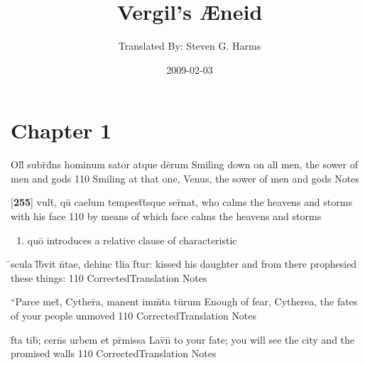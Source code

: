 \documentclass[]{book}
\title{Vergil's {\AE}neid}
\author{ Translated By:  Steven G. Harms }
\date{2009-02-03}
\begin{document}

\ifpdf
{}
\else
{}
\fi

\enumstyle 

\maketitle
\tableofcontents

\chapter{Chapter 1}
%
%
%
%
%
%
%
%
%

\latline
  {Oll\={\macron {\i}} subr\={\macron {\i}}d\={}ns hominum sator atque de\={}rum}
  { Smiling down on all men, the sower of men and gods }
  {110}
  { Smiling at that one, Venus, the sower of men and gods }
  { Notes }


\latline
  {[\textbf{255}] vult\={}, qu\={} caelum tempest\={}t\={}sque ser\={}nat,}
  { who calms the heavens and storms with his face }
  {110}
  { by means of which face calms the heavens and storms }
  { \begin{enumerate}
  	\item qu\={o} introduces a relative clause of characteristic
  \end{enumerate} }


\latline
  {\={}scula l\={\macron {\i}}b\={}vit n\={}tae, dehinc t\={}lia f\={}tur:}
  { kissed his daughter and from there prophesied these things: }
  {110}
  { CorrectedTranslation }
  { Notes }


\latline
  {``Parce met\={}, Cyther\={}a, manent imm\={}ta tu\={}rum}
  { Enough of fear, Cytherea, the fates of your people unmoved  }
  {110}
  { CorrectedTranslation }
  { Notes }


\latline
  {f\={}ta tib\={\macron {\i}}; cern\={}s urbem et pr\={}missa Lav\={\macron {\i}}n\={\macron {\i}}}
  { to your fate; you will see the city and the promised walls }
  {110}
  { CorrectedTranslation }
  { Notes }
\end{document}
